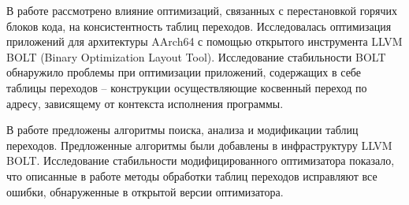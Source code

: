 В работе рассмотрено влияние оптимизаций, связанных с перестановкой горячих блоков кода, на консистентность таблиц переходов. Исследовалась оптимизация приложений для архитектуры AArch64 с помощью открытого инструмента LLVM BOLT (Binary Optimization Layout Tool). Исследование стабильности BOLT обнаружило проблемы при оптимизации приложений, содержащих в себе таблицы переходов – конструкции осуществляющие косвенный переход по адресу, зависящему от контекста исполнения программы.

В работе предложены алгоритмы поиска, анализа и модификации таблиц переходов.  Предложенные алгоритмы были добавлены в инфраструктуру LLVM BOLT. Исследование стабильности модифицированного оптимизатора показало, что описанные в работе методы обработки таблиц переходов исправляют все ошибки, обнаруженные в открытой версии оптимизатора.
